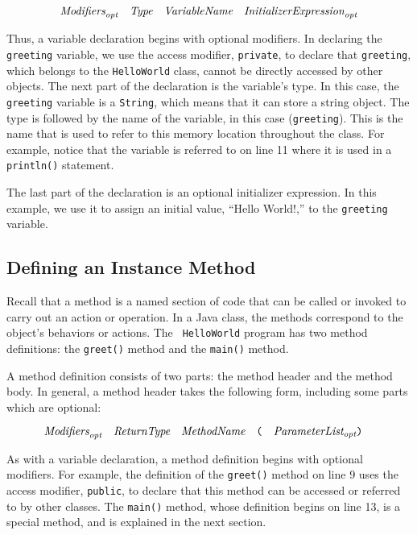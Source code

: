 $$
\hbox{\it Modifiers}_{\hbox{\scriptsize\it opt}}\quad
\hbox{\it Type}\quad
\hbox{\it VariableName}\quad
\hbox{\it InitializerExpression}_{\hbox{\scriptsize\it opt}}
$$

\noindent Thus, a variable declaration begins with optional modifiers. 
In declaring the {\tt greeting} variable, we use the access modifier,
{\tt private}, to declare that {\tt greeting}, which belongs to the
{\tt HelloWorld} class, cannot be directly accessed by other
objects. The next part of the declaration is the variable's type. In
this case, the {\tt greeting} variable is a {\tt String}, which means
that it can store a string object.  The type is followed by the name
of the variable, in this case ({\tt greeting}). This is the name that
is used to refer to this memory location throughout the class. For
example, notice that the variable is referred to on line 11 where it
is used in a {\tt println()} statement.

The last part of the declaration is an optional initializer
expression. In this example, we use it to assign an initial value,
``Hello World!,'' to the {\tt greeting} variable.  

\subsection{Defining an Instance Method}

Recall that a method is a named section of code that can be called or
invoked to carry out an action or operation.  In a Java class, the
methods correspond to the object's behaviors or actions. The {\tt
HelloWorld} program has two method definitions: the {\tt greet()}
method and the {\tt main()} method.

A method definition consists of two parts: the method header and the
method body. In general, a method header takes the following
form, including some parts which are optional:

$$
\hbox{\it Modifiers}_{\hbox{\scriptsize\it opt}}\quad
\hbox{\it ReturnType}\quad
\hbox{\it MethodName}\quad
\hbox{\tt (}\quad
\hbox{\it ParameterList}_{\hbox{\scriptsize\it opt}}
\hbox{\tt )}\quad
$$

\noindent As with a variable declaration, a method definition
begins with optional modifiers. For example, the definition of the
{\tt greet()} method on line 9 uses the access modifier, {\tt public},
to declare that this method can be accessed or referred to by other
classes.  The {\tt main()} method, whose definition begins on line 13,
is a special method, and is explained in the next section.

